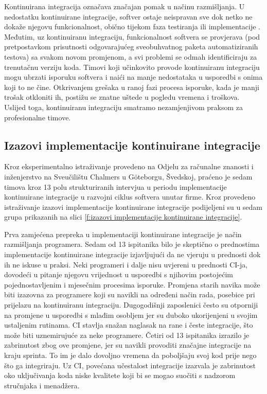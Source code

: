 \documentclass[a4paper,12pt,oneside]{article}
\begin{document}
Kontinuirana integracija označava značajan pomak u načinu razmišljanja. U nedostatku kontinuirane integracije, softver ostaje neispravan sve dok netko ne dokaže njegovu funkcionalnost, obično tijekom faza testiranja ili implementacije \cite{humble2010continuous}. Međutim, uz kontinuiranu integraciju, funkcionalnost softvera se provjerava (pod pretpostavkom prisutnosti odgovarajućeg sveobuhvatnog paketa automatiziranih testova) sa svakom novom promjenom, a svi problemi se odmah identificiraju za trenutačnu verziju koda. Timovi koji učinkovito provode kontinuiranu integraciju mogu ubrzati isporuku softvera i naići na manje nedostataka u usporedbi s onima koji to ne čine. Otkrivanjem grešaka u ranoj fazi procesa isporuke, kada je manji trošak otkloniti ih, postižu se znatne uštede u pogledu vremena i troškova. Uslijed toga, kontinuiranu integraciju smatramo nezamjenjivom praksom za profesionalne timove.


\subsection{Izazovi implementacije kontinuirane integracije}
Kroz eksperimentalno istraživanje \cite{challenges} provedeno na Odjelu za računalne znanosti i inženjerstvo na Sveučilištu Chalmers u Göteborgu, Švedskoj, praćeno je sedam timova kroz 13 polu strukturiranih intervjua u periodu implementacije kontinuirane integracije u razvojni ciklus softvera unutar firme. Kroz provedeno istraživanje izazovi implementacije kontinuirane integracije podijeljeni su u sedam grupa prikazanih na slici \ref{f:izazovi implementacije kontinuirane integracije}.

Prva zamjećena prepreka u implementaciji kontinuirane integracije je način razmišljanja programera. Sedam od 13 ispitanika bilo je skeptično o prednostima implementacije kontinuirane integracije izjavljujući da ne vjeruju u prednosti dok ih ne iskuse u praksi. Neki programeri i dalje nisu uvjereni u prednosti CI-ja, dovodeći u pitanje njegovu vrijednost u usporedbi s njihovim postojećim pojednostavljenim i mjesečnim procesima isporuke. Promjena starih navika može biti izazovna za programere koji su navikli na određeni način rada, posebice pri prijelazu na kontinuiranu integraciju. Dugogodišnji zaposlenici često su otporniji na promjene u usporedbi s mlađim osobljem jer su duboko ukorijenjeni u svojim ustaljenim rutinama. CI stavlja snažan naglasak na rane i česte integracije, što može biti uznemirujuće za neke programere. Četiri od 13 ispitanika izrazilo je zabrinutost zbog ove promjene, jer su navikli provoditi značajne integracije na kraju sprinta. To im je dalo dovoljno vremena da poboljšaju svoj kod prije nego što ga integriraju. Uz CI, povećana učestalost integracije izazvala je zabrinutost oko uključivanja koda niske kvalitete koji bi se mogao suočiti s nadzorom stručnjaka i menadžera.
\end{document}
